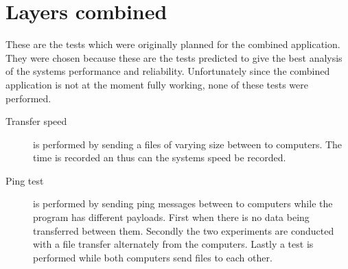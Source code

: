 \section{Layers combined}

These are the tests which were originally planned for the combined application. They were chosen because these are the tests predicted to give the best analysis of the systems performance and reliability. Unfortunately since the combined application is not at the moment fully working, none of these tests were performed.

\begin{description}
\item[Transfer speed] is performed by sending a files of varying size between to computers. The time is recorded an thus can the systems speed be recorded.
\item[Ping test] is performed by sending ping messages between to computers while the program has different payloads. First when there is no data being transferred between them. Secondly the two experiments are conducted with a file transfer alternately from the computers. Lastly a test is performed while both computers send files to each other.  
\end{description}
